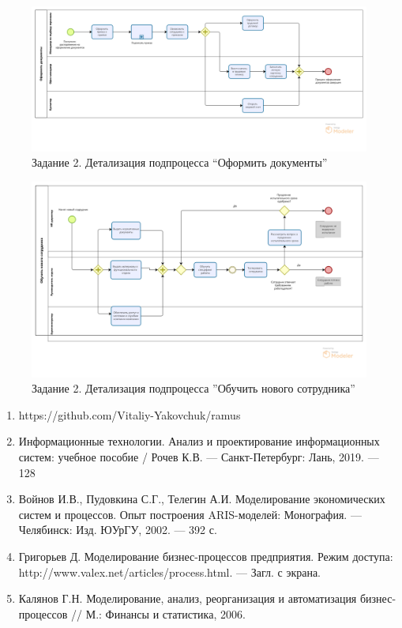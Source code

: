 \documentclass[a4paper,14pt]{extarticle}
\begin{document}
	\begin{figure}[htpb]
	\centering
	\includegraphics[width=0.6\linewidth]{images/pr-10/documents}
	\caption{Задание 2. Детализация подпроцесса “Оформить документы”}
	\label{fig:pr10-emp3}
\end{figure}
	\begin{figure}[htpb]
	\centering
	\includegraphics[width=0.7\linewidth]{images/pr-10/education}
	\caption{Задание 2. Детализация подпроцесса ”Обучить нового сотрудника”}
	\label{fig:pr10-emp4}
\end{figure}
\hfill
\newpage
{}
\begin{enumerate}
	\item https://github.com/Vitaliy-Yakovchuk/ramus
	\item Информационные технологии. Анализ и проектирование информационных систем: учебное пособие / Рочев К.В. --- Санкт-Петербург: Лань, 2019. --- 128

	
	\item Войнов И.В., Пудовкина С.Г., Телегин А.И. Моделирование экономических систем и процессов. Опыт построения ARIS-моделей: Монография. --- Челябинск: Изд. ЮУрГУ, 2002. --- 392 с.
	
	
	\item Григорьев Д. Моделирование бизнес-процессов предприятия. Режим доступа: http://www.valex.net/articles/process.html. --- Загл. с экрана.
	
	\item Калянов Г.Н. Моделирование, анализ, реорганизация и автоматизация бизнес-процессов // М.: Финансы и статистика, 2006.
\end{enumerate}


\end{document}
